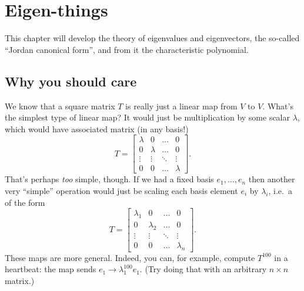 \chapter{Eigen-things}
This chapter will develop the theory of eigenvalues and eigenvectors,
the so-called ``Jordan canonical form'',
and from it the characteristic polynomial.

\section{Why you should care}
We know that a square matrix $T$ is really just
a linear map from $V$ to $V$.
What's the simplest type of linear map?
It would just be multiplication by some scalar $\lambda$,
which would have associated matrix (in any basis!)
\[
	T = 
	\begin{bmatrix}
		\lambda & 0 & \dots & 0 \\
		0 & \lambda & \dots & 0 \\
		\vdots & \vdots & \ddots & \vdots \\
		0 & 0 & \dots & \lambda
	\end{bmatrix}.
\]
That's perhaps \emph{too} simple, though.
If we had a fixed basis $e_1, \dots, e_n$
then another very ``simple'' operation
would just be scaling each basis element $e_i$ by $\lambda_i$,
i.e.\ a  of the form
\[
	T = \begin{bmatrix}
		\lambda_1 & 0 & \dots & 0 \\
		0 & \lambda_2 & \dots & 0 \\
		\vdots & \vdots & \ddots & \vdots \\
		0 & 0 & \dots & \lambda_n
	\end{bmatrix}.
\]
These maps are more general.
Indeed, you can, for example, compute $T^{100}$ in a heartbeat:
the map sends $e_1 \to \lambda_1^{100} e_1$.
(Try doing that with an arbitrary $n \times n$ matrix.)

